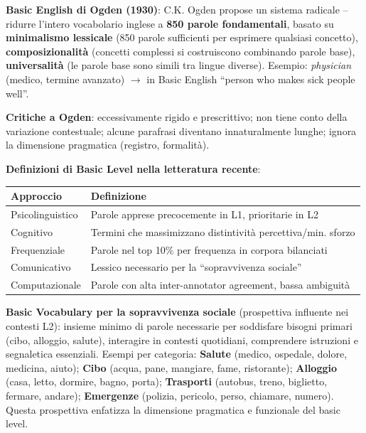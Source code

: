 \documentclass[12pt,a4paper]{article}
\begin{document}
\textbf{Basic English di Ogden (1930)}: C.K. Ogden propose un sistema radicale -- ridurre l'intero vocabolario inglese a \textbf{850 parole fondamentali}, basato su \textbf{minimalismo lessicale} (850 parole sufficienti per esprimere qualsiasi concetto), \textbf{composizionalit\`a} (concetti complessi si costruiscono combinando parole base), \textbf{universalit\`a} (le parole base sono simili tra lingue diverse). Esempio: \textit{physician} (medico, termine avanzato) $\to$ in Basic English ``person who makes sick people well''.

\textbf{Critiche a Ogden}: eccessivamente rigido e prescrittivo; non tiene conto della variazione contestuale; alcune parafrasi diventano innaturalmente lunghe; ignora la dimensione pragmatica (registro, formalit\`a).

\begin{resultbox}
\textbf{Definizioni di Basic Level nella letteratura recente}:
\begin{center}
\small
\begin{tabular}{ll}
\toprule
\textbf{Approccio} & \textbf{Definizione} \\
\midrule
Psicolinguistico & Parole apprese precocemente in L1, prioritarie in L2 \\
Cognitivo & Termini che massimizzano distintivit\`a percettiva/min. sforzo \\
Frequenziale & Parole nel top 10\% per frequenza in corpora bilanciati \\
Comunicativo & Lessico necessario per la ``sopravvivenza sociale'' \\
Computazionale & Parole con alta inter-annotator agreement, bassa ambiguit\`a \\
\bottomrule
\end{tabular}
\end{center}
\end{resultbox}

\textbf{Basic Vocabulary per la sopravvivenza sociale} (prospettiva influente nei contesti L2): insieme minimo di parole necessarie per soddisfare bisogni primari (cibo, alloggio, salute), interagire in contesti quotidiani, comprendere istruzioni e segnaletica essenziali. Esempi per categoria: \textbf{Salute} (medico, ospedale, dolore, medicina, aiuto); \textbf{Cibo} (acqua, pane, mangiare, fame, ristorante); \textbf{Alloggio} (casa, letto, dormire, bagno, porta); \textbf{Trasporti} (autobus, treno, biglietto, fermare, andare); \textbf{Emergenze} (polizia, pericolo, perso, chiamare, numero). Questa prospettiva enfatizza la dimensione pragmatica e funzionale del basic level.
\end{document}
